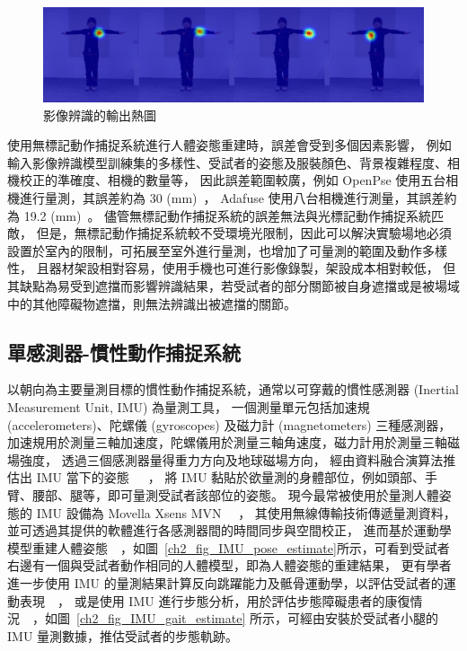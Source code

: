 \begin{figure}[!ht]
    \centering
    \includegraphics[width=\linewidth]{figure/ch2_fig_heatmap.jpg}
     \caption[影像辨識的輸出熱圖]{影像辨識的輸出熱圖}
     \label{ch2_fig_heatmap}
\end{figure}

使用無標記動作捕捉系統進行人體姿態重建時，誤差會受到多個因素影響，
例如輸入影像辨識模型訓練集的多樣性、受試者的姿態及服裝顏色、背景複雜程度、相機校正的準確度、相機的數量等，
因此誤差範圍較廣，例如 OpenPse 使用五台相機進行量測，其誤差約為 30 (mm)~\cite{nakano2020evaluation}，
Adafuse 使用八台相機進行測量，其誤差約為 19.2 (mm)~\cite{zhang2020adafuse}。
儘管無標記動作捕捉系統的誤差無法與光標記動作捕捉系統匹敵，
但是，無標記動作捕捉系統較不受環境光限制，因此可以解決實驗場地必須設置於室內的限制，可拓展至室外進行量測，也增加了可量測的範圍及動作多樣性，
且器材架設相對容易，使用手機也可進行影像錄製，架設成本相對較低，
但其缺點為易受到遮擋而影響辨識結果，若受試者的部分關節被自身遮擋或是被場域中的其他障礙物遮擋，則無法辨識出被遮擋的關節。

\subsection{單感測器-慣性動作捕捉系統}
以朝向為主要量測目標的慣性動作捕捉系統，通常以可穿戴的慣性感測器 (Inertial Measurement Unit, IMU) 為量測工具，
一個測量單元包括加速規 (accelerometers)、陀螺儀 (gyroscopes) 及磁力計 (magnetometers) 三種感測器，
加速規用於測量三軸加速度，陀螺儀用於測量三軸角速度，磁力計用於測量三軸磁場強度，
透過三個感測器量得重力方向及地球磁場方向，
經由資料融合演算法推估出 IMU 當下的姿態~\cite{young2009comparison}~\cite{madgwick2011estimation}~\cite{nazarahari202140}，
將 IMU 黏貼於欲量測的身體部位，例如頭部、手臂、腰部、腿等，即可量測受試者該部位的姿態。
現今最常被使用於量測人體姿態的 IMU 設備為 Movella Xsens MVN ~\cite{roetenberg2009xsens}~\cite{paulich2018xsens}，
其使用無線傳輸技術傳遞量測資料，並可透過其提供的軟體進行各感測器間的時間同步與空間校正，
進而基於運動學模型重建人體姿態~\cite{mcgrath2020body}~\cite{DIP:SIGGRAPHAsia:2018}，如圖~\ref{ch2_fig_IMU_pose_estimate}所示，可看到受試者右邊有一個與受試者動作相同的人體模型，即為人體姿態的重建結果，
更有學者進一步使用 IMU 的量測結果計算反向跳躍能力及骶骨運動學，以評估受試者的運動表現~\cite{mcginnis2016quantifying}~\cite{miranda2022accuracy}，
或是使用 IMU 進行步態分析，用於評估步態障礙患者的康復情況~\cite{wang2020imu}~\cite{uchitomi2022three}，如圖~\ref{ch2_fig_IMU_gait_estimate} 所示，可經由安裝於受試者小腿的 IMU 量測數據，推估受試者的步態軌跡。

